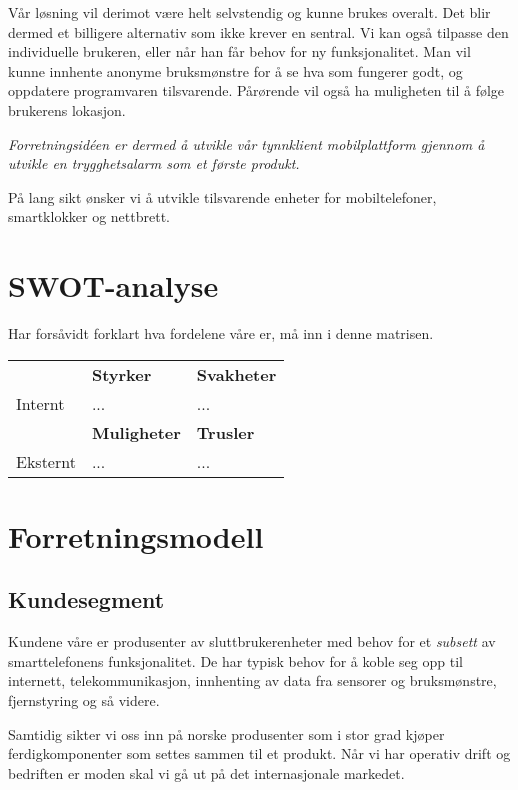 Vår løsning vil derimot være helt selvstendig og kunne brukes overalt. Det blir
dermed et billigere alternativ som ikke krever en sentral. Vi kan også tilpasse
den individuelle brukeren, eller når han får behov for ny funksjonalitet. Man
vil kunne innhente anonyme bruksmønstre for å se hva som fungerer godt, og
oppdatere programvaren tilsvarende. Pårørende vil også ha muligheten til å
følge brukerens lokasjon.

\textit{Forretningsidéen er dermed å utvikle vår tynnklient mobilplattform
gjennom å utvikle en trygghetsalarm som et første produkt.}

På lang sikt ønsker vi å utvikle tilsvarende enheter for mobiltelefoner,
smartklokker og nettbrett.

\section{SWOT-analyse}

Har forsåvidt forklart hva fordelene våre er, må inn i denne matrisen.

\begin{table}[h]
  \begin{tabular}{lll}
  & \textbf{Styrker}
  & \textbf{Svakheter} \\
  Internt
  & ...
  & ...
  \\
  & \textbf{Muligheter}
  & \textbf{Trusler} \\
  Eksternt
  & ...
  & ...
  \\
  \end{tabular}
\end{table}

\section{Forretningsmodell}

\subsection{Kundesegment}

Kundene våre er produsenter av sluttbrukerenheter med behov for et
\textit{subsett} av smarttelefonens funksjonalitet. De har typisk behov for å
koble seg opp til internett, telekommunikasjon, innhenting av data fra sensorer
og bruksmønstre, fjernstyring og så videre.

Samtidig sikter vi oss inn på norske produsenter som i stor grad kjøper
ferdigkomponenter som settes sammen til et produkt.  Når vi har operativ drift
og bedriften er moden skal vi gå ut på det internasjonale markedet.

